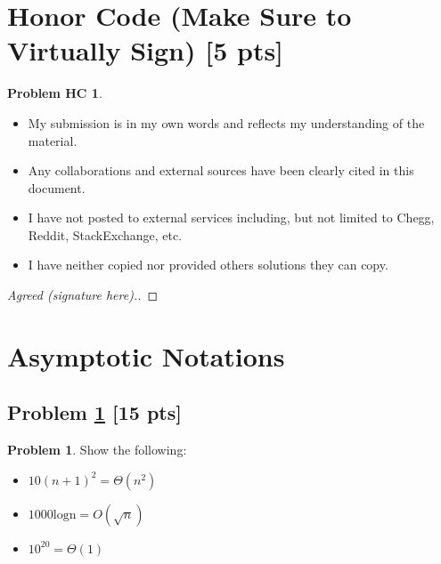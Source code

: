 \documentclass[11pt]{article}
\theoremstyle{definition}
\theoremstyle{definition}
\newtheorem{required}{Problem}
\newtheorem*{requiredHC}{Problem HC}
\theoremstyle{definition}
\begin{document}
\section*{Honor Code (Make Sure to Virtually Sign) [5 pts]} \label{HonorCode}

\begin{requiredHC}
\begin{itemize}
\item My submission is in my own words and reflects my understanding of the material.
\item Any collaborations and external sources have been clearly cited in this document.
\item I have not posted to external services including, but not limited to Chegg, Reddit, StackExchange, etc.
\item I have neither copied nor provided others solutions they can copy.
\end{itemize}

\end{requiredHC}

\begin{proof}[Agreed (signature here).]
\end{proof}

\newpage
\section{Asymptotic Notations}

\subsection{Problem \ref{Asymptotics1} [15 pts]} 
\begin{required} \label{Asymptotics1}
Show the following:

\begin{itemize}
    \item $10(n + 1)^2 = \Theta(n^2)$
    \item $1000\text{logn} = O(\sqrt{n})$
    \item $10^{20} = \Theta(1)$
\end{itemize}

\end{required}
\end{document}
